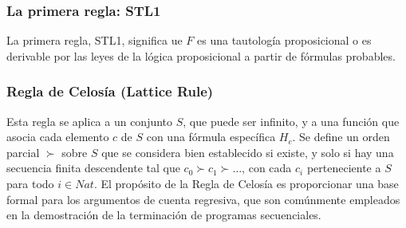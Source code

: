 \subsubsection{La primera regla: STL1}
La primera regla, STL1, significa ue $F$ es una tautología proposicional o es derivable por las leyes de la lógica proposicional a partir de fórmulas probables.

\subsubsection{Regla de Celosía (Lattice Rule)}
Esta regla se aplica a un conjunto $S$, que puede ser infinito, y a una función que asocia cada elemento $c$ de $S$ con una fórmula específica $H_c$. Se define un orden parcial $\succ$ sobre $S$ que se considera bien establecido si existe, y solo si hay una secuencia finita descendente tal que $c_0 \succ c_1 \succ \ldots$, con cada $c_i$ perteneciente a $S$ para todo $i \in Nat$. El propósito de la Regla de Celosía es proporcionar una base formal para los argumentos de cuenta regresiva, que son comúnmente empleados en la demostración de la terminación de programas secuenciales.

